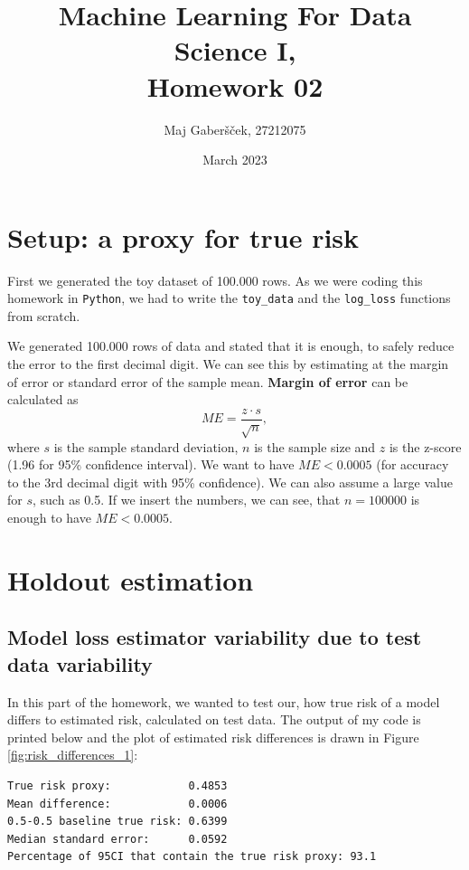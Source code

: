 \documentclass{article}
\title{Machine Learning For Data Science I, \\[0.1cm] Homework 02}
\author{Maj Gaberšček, 27212075}
\date{March 2023}
\begin{document}
\maketitle

\section{Setup: a proxy for true risk}

First we generated the toy dataset of 100.000 rows. As we were coding this homework in \texttt{Python}, we had to write the \texttt{toy\_data} and the \texttt{log\_loss} functions from scratch. 


We generated 100.000 rows of data and stated that it is enough, to safely reduce the error to the first decimal digit. We can see this by estimating at the margin of error or standard error of the sample mean. \textbf{Margin of error} can be calculated as 
$$ME = \frac{z \cdot s}{\sqrt{n}},$$
where $s$ is the sample standard deviation, $n$ is the sample size and $z$ is the z-score (1.96 for 95\% confidence interval).
We want to have $ME < 0.0005$ (for accuracy to the 3rd decimal digit with 95\% confidence). We can also assume a large value for $s$, such as 0.5. If we insert the numbers, we can see, that $n=100000$ is enough to have $ME < 0.0005$.


\section{Holdout estimation}

\subsection{Model loss estimator variability due to test data variability}

In this part of the homework, we wanted to test our, how true risk of a model differs to estimated risk, calculated on test data. The output of my code is printed below and the plot of estimated risk differences is drawn in Figure \ref{fig:risk_differences_1}:

\begin{lstlisting}[basicstyle=\small\ttfamily]
True risk proxy:            0.4853
Mean difference:            0.0006
0.5-0.5 baseline true risk: 0.6399
Median standard error:      0.0592
Percentage of 95CI that contain the true risk proxy: 93.1
\end{lstlisting}
\end{document}
